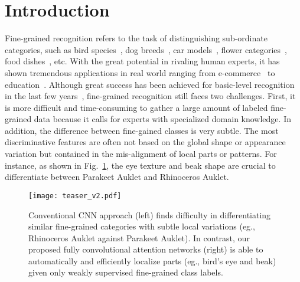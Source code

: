 \documentclass[10pt,twocolumn,letterpaper]{article}
\begin{document}
\section{Introduction}
Fine-grained recognition refers to the task of distinguishing sub-ordinate categories, such as bird species~\cite{wah2011caltech}, dog breeds~\cite{khosla2011novel}, car models~\cite{krause20133d}, flower categories~\cite{nilsback2008automated}, food dishes~\cite{bossard2014food}, etc.
With the great potential in rivaling human experts, it has shown tremendous applications in real world ranging from e-commerce~\cite{bell2015learning, hadi2015buy} to education~\cite{kumar2012leafsnap, berg2014birdsnap}.
Although great success has been achieved for basic-level recognition in the last few years~\cite{krizhevsky2012imagenet, simonyan2014very, szegedy2015going, he2016deep}, fine-grained recognition still faces two challenges.
First, it is more difficult and time-consuming to gather a large amount of labeled fine-grained data because it calls for experts with specialized domain knowledge.
In addition, the difference between fine-gained classes is very subtle.
The most discriminative features are often not based on the global shape or appearance variation but contained in the mis-alignment of local parts or patterns.
For instance, as shown in Fig.~\ref{fig:teaser}, the eye texture and beak shape are crucial to differentiate between Parakeet Auklet and Rhinoceros Auklet.

\begin{figure}
\begin{center}
\texttt{[image: teaser\_v2.pdf]}
\end{center}
\caption{Conventional CNN approach (left) finds difficulty in differentiating similar fine-grained categories with subtle local variations (eg., Rhinoceros Auklet against Parakeet Auklet).
In contrast, our proposed fully convolutional attention networks (right) is able to automatically and efficiently localize parts (eg., bird's eye and beak) given only weakly supervised fine-grained class labels.
}
\label{fig:teaser}
\end{figure}
\end{document}
